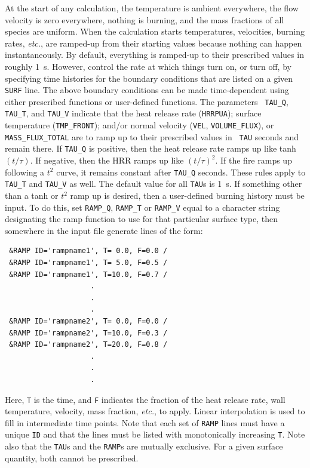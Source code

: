 \documentclass[11pt]{book}
\newcommand{\ct}{\tt\small}
\begin{document}
At the start of any calculation, the temperature is ambient
everywhere, the flow velocity is zero everywhere, nothing is burning,
and the mass fractions of all species are uniform.  When the
calculation starts temperatures, velocities, burning rates, {\em
etc.}, are ramped-up from their starting values because nothing can
happen instantaneously. By default, everything is ramped-up to their
prescribed values in roughly 1~s. However, control the rate at which
things turn on, or turn off, by specifying time histories for the
boundary conditions that are listed on a given {\ct SURF} line.  The
above boundary conditions can be made time-dependent using either
prescribed functions or user-defined functions.  The parameters {\ct
TAU\_Q}, {\ct TAU\_T}, and {\ct TAU\_V} indicate that the heat release
rate ({\ct HRRPUA}); surface temperature ({\ct TMP\_FRONT}); and/or
normal velocity ({\ct VEL}, {\ct VOLUME\_FLUX}), or {\ct
MASS\_FLUX\_TOTAL} are to ramp up to their prescribed values in {\ct
TAU} seconds and remain there.  If {\ct TAU\_Q} is positive, then the
heat release rate ramps up like tanh$(t/\tau)$. If negative, then the
HRR ramps up like $(t/\tau)^2$. If the fire ramps up following a $t^2$
curve, it remains constant after {\ct TAU\_Q} seconds.  These rules
apply to {\ct TAU\_T} and {\ct TAU\_V} as well.  The default value for
all {\ct TAU}s is 1~s.  If something other than a tanh or $t^2$ ramp
up is desired, then a user-defined burning history must be input. To
do this, set {\ct RAMP\_Q}, {\ct RAMP\_T} or {\ct RAMP\_V} equal to a
character string designating the ramp function to use for that
particular surface type, then somewhere in the input file generate
lines of the form:

\footnotesize
\begin{verbatim}
 &RAMP ID='rampname1', T= 0.0, F=0.0 /
 &RAMP ID='rampname1', T= 5.0, F=0.5 /
 &RAMP ID='rampname1', T=10.0, F=0.7 /
                    .
                    .
                    .
 &RAMP ID='rampname2', T= 0.0, F=0.0 /
 &RAMP ID='rampname2', T=10.0, F=0.3 /
 &RAMP ID='rampname2', T=20.0, F=0.8 /
                    .
                    .
                    .
\end{verbatim}
\normalsize

\noindent
Here, {\ct T} is the time, and {\ct F} indicates the fraction of the heat
release rate, wall temperature, velocity, mass fraction, {\em etc.}, to apply.
Linear interpolation is used to fill in intermediate time points.
Note that each set of {\ct RAMP} lines must have a unique {\ct ID} and that the lines must
be listed with monotonically increasing {\ct T}.
Note also that the {\ct TAU}s and the {\ct RAMP}s are mutually exclusive. For a given
surface quantity, both cannot be prescribed.
\end{document}
